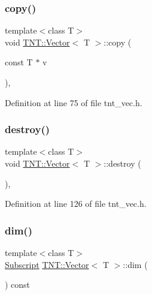 \mbox{\label{classTNT_1_1Vector_a85902585fa9de818133ead8a89b194ac}} 
\subsubsection{\texorpdfstring{copy()}{copy()}}
{\footnotesize\ttfamily template$<$class T$>$ \\
void \hyperlink{classTNT_1_1Vector}{T\+N\+T\+::\+Vector}$<$ T $>$\+::copy (\begin{DoxyParamCaption}\item[{const T $\ast$}]{v }\end{DoxyParamCaption})\hspace{0.3cm}{\ttfamily [inline]}, {\ttfamily [protected]}}



Definition at line 75 of file tnt\+\_\+vec.\+h.

\mbox{\label{classTNT_1_1Vector_afb46bf5892eb43cbd0b8cc8f7a126710}} 
\subsubsection{\texorpdfstring{destroy()}{destroy()}}
{\footnotesize\ttfamily template$<$class T$>$ \\
void \hyperlink{classTNT_1_1Vector}{T\+N\+T\+::\+Vector}$<$ T $>$\+::destroy (\begin{DoxyParamCaption}{ }\end{DoxyParamCaption})\hspace{0.3cm}{\ttfamily [inline]}, {\ttfamily [protected]}}



Definition at line 126 of file tnt\+\_\+vec.\+h.

\mbox{\label{classTNT_1_1Vector_a5245f2860259591e00fdfcc9ff73cb09}} 
\subsubsection{\texorpdfstring{dim()}{dim()}}
{\footnotesize\ttfamily template$<$class T$>$ \\
\hyperlink{namespaceTNT_af22e3f1460e145c04ce4e7d701e4c1c1}{Subscript} \hyperlink{classTNT_1_1Vector}{T\+N\+T\+::\+Vector}$<$ T $>$\+::dim (\begin{DoxyParamCaption}{ }\end{DoxyParamCaption}) const\hspace{0.3cm}{\ttfamily [inline]}}



